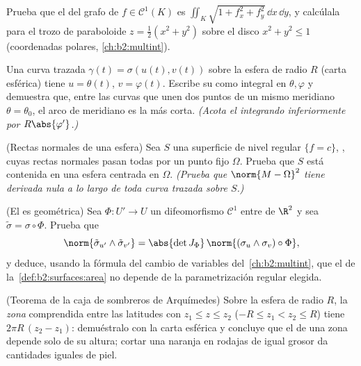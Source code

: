 \begin{exercise}[$\star\star$]\label{exo:b2:surfaces:5}
Prueba que el  del grafo de $f \in \mathcal{C}^1(K)$ es $\iint_K
\sqrt{1 + f_x^2 + f_y^2}\,\dd x\,\dd y$, y calcúlala para el trozo de
paraboloide $z = \frac12(x^2 + y^2)$ sobre el disco $x^2 + y^2 \leq
1$ (coordenadas polares, \cref{ch:b2:multint}).
\end{exercise}

\begin{exercise}[$\star\star$]\label{exo:b2:surfaces:6}
Una curva trazada $\gamma(t) = \sigma(u(t), v(t))$ sobre la esfera de
radio $R$ (carta esférica) tiene $u = \theta(t)$, $v = \varphi(t)$.
Escribe su  como integral en $\theta, \varphi$ y demuestra
que, entre las curvas que unen dos puntos de un mismo meridiano
$\theta = \theta_0$, el arco de meridiano es la más corta.
\emph{(Acota el integrando inferiormente por $R\abs{\varphi'}$.)}
\end{exercise}

\begin{exercise}[$\star\star\star$]\label{exo:b2:surfaces:7}
(Rectas normales de una esfera) Sea $S$ una superficie de nivel
regular $\{f = c\}$, , cuyas rectas normales pasan todas por
un punto fijo $\Omega$. Prueba que $S$ está contenida en una esfera
centrada en $\Omega$. \emph{(Prueba que $\norm{M - \Omega}^2$ tiene
derivada nula a lo largo de toda curva trazada sobre $S$.)}
\end{exercise}

\begin{exercise}[$\star\star\star$]\label{exo:b2:surfaces:8}
(El  es geométrica) Sea $\Phi \colon U' \to U$ un difeomorfismo
$\mathcal{C}^1$ entre  de $\R^2$ y sea $\tilde\sigma = \sigma
\circ \Phi$. Prueba que
\[
\norm{\tilde\sigma_{u'} \wedge \tilde\sigma_{v'}}
= \abs{\det J_\Phi}\,
\norm{(\sigma_u \wedge \sigma_v)\circ\Phi} ,
\]
y deduce, usando la fórmula del cambio de variables del~\cref{ch:b2:multint}, que el  de la~\cref{def:b2:surfaces:area} no depende de la parametrización regular
elegida.
\end{exercise}

\begin{exercise}[$\star$]\label{exo:b2:surfaces:9}
(Teorema de la caja de sombreros de Arquímedes) Sobre la esfera de
radio $R$, la \emph{zona} comprendida entre las latitudes con $z_1
\leq z \leq z_2$ ($-R \leq z_1 < z_2 \leq R$) tiene  $2\pi
R\,(z_2 - z_1)$: demuéstralo con la carta esférica y concluye que el
 de una zona depende solo de su altura; cortar una naranja en
rodajas de igual grosor da cantidades iguales de piel.
\end{exercise}

